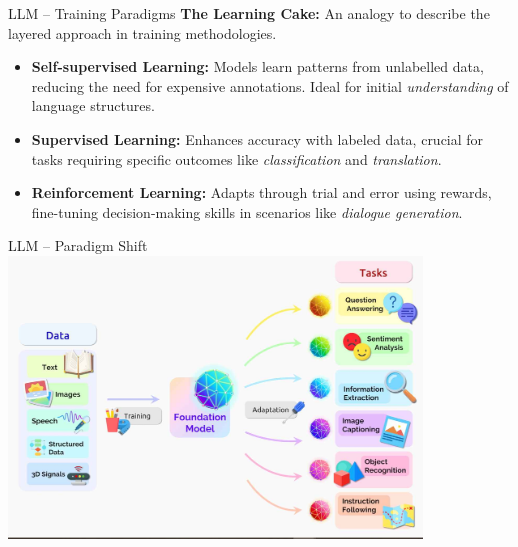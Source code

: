 \documentclass[presentation, 10pt]{beamer}\mode<presentation>{\usetheme{AMSBolognaFC}}
\begin{document}
\begin{frame}{LLM -- Training Paradigms}
\textbf{The Learning Cake:} An analogy to describe the layered approach in training methodologies.
\begin{itemize}
    \item \textbf{Self-supervised Learning:} Models learn patterns from unlabelled data, reducing the need for expensive annotations. Ideal for initial \emph{understanding} of language structures.
    \item \textbf{Supervised Learning:} Enhances accuracy with labeled data, crucial for tasks requiring specific outcomes like \emph{classification} and \emph{translation}.
    \item \textbf{Reinforcement Learning:} Adapts through trial and error using rewards, fine-tuning decision-making skills in scenarios like \emph{dialogue generation}.
\end{itemize}
\end{frame}
\begin{frame}{LLM -- Paradigm Shift}
	\centering
	\includegraphics[height=7.5cm]{img/llm-idea.jpg}
\end{frame}
\end{document}
